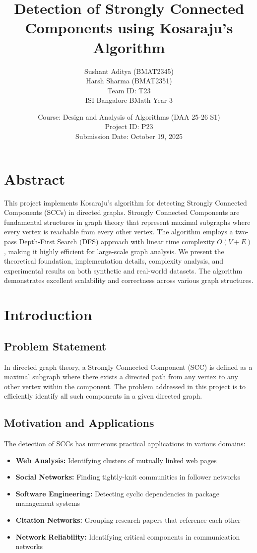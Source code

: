\documentclass{book}
\title{\textbf{Detection of Strongly Connected Components using Kosaraju's Algorithm}}
\author{
    Sushant Aditya (BMAT2345) \\
    Harsh Sharma (BMAT2351) \\
    \small{Team ID: T23} \\
    \small{ISI Bangalore BMath Year 3}
}
\date{
    Course: Design and Analysis of Algorithms (DAA 25-26 S1) \\
    Project ID: P23 \\
    Submission Date: October 19, 2025
}
\theoremstyle{definition}
\begin{document}
\maketitle
\tableofcontents


\chapter*{Abstract}
This project implements Kosaraju's algorithm for detecting Strongly Connected Components (SCCs) in directed graphs. Strongly Connected Components are fundamental structures in graph theory that represent maximal subgraphs where every vertex is reachable from every other vertex. The algorithm employs a two-pass Depth-First Search (DFS) approach with linear time complexity $O(V + E)$, making it highly efficient for large-scale graph analysis. We present the theoretical foundation, implementation details, complexity analysis, and experimental results on both synthetic and real-world datasets. The algorithm demonstrates excellent scalability and correctness across various graph structures.




\chapter{Introduction}
\section{Problem Statement}
In directed graph theory, a Strongly Connected Component (SCC) is defined as a maximal subgraph where there exists a directed path from any vertex to any other vertex within the component. The problem addressed in this project is to efficiently identify all such components in a given directed graph.

\section{Motivation and Applications}
The detection of SCCs has numerous practical applications in various domains:

\begin{itemize}
    \item \textbf{Web Analysis:} Identifying clusters of mutually linked web pages
    \item \textbf{Social Networks:} Finding tightly-knit communities in follower networks
    \item \textbf{Software Engineering:} Detecting cyclic dependencies in package management systems
    \item \textbf{Citation Networks:} Grouping research papers that reference each other
    \item \textbf{Network Reliability:} Identifying critical components in communication networks
\end{itemize}
\end{document}
